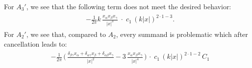 For $A_3'$, we see that the following term does not meet the desired behavior:
\begin{align}
  \label{eq:Q2}
  \tag{Q2}
  \begin{alignedat}{1}
  &- \frac{1}{2 \pi } k \, \frac{x_\alpha x_\beta x_\gamma}{|x|^3} \; \cdot \; c_1 \, (k|x|)^{2 \cdot 1 - 3}. 
  \end{alignedat}
\end{align}
For $A_2'$, we see that, compared to $A_2$, every summand is problematic which after cancellation leads to:
\begin{align}
  \label{eq:Q3}
  \tag{Q3}
  \begin{alignedat}{1}
  &- \frac{1}{2\pi} \, \bigg(\,\frac{\delta_{\beta\gamma} x_\alpha + \delta_{\alpha \gamma} x_\beta + \delta_{\alpha \beta} x_\gamma}{|x|^2} - 3\, \frac{x_\alpha x_\beta x_\gamma}{|x|^4} \, \bigg) 
    \,\cdot \; c_1 \, (k|x|)^{2\cdot 1 - 2} \, C_1 \\[1.0em]

\end{alignedat}
\end{align}
